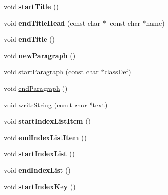 \begin{DoxyCompactItemize}
\mbox{\label{class_r_t_f_generator_af0954cd0854f60839004dda1b134f7e3}} 
void {\bfseries start\+Title} ()
\item 
\mbox{\label{class_r_t_f_generator_a881f413de3acd54c6bd5977c4add08d4}} 
void {\bfseries end\+Title\+Head} (const char $\ast$, const char $\ast$name)
\item 
\mbox{\label{class_r_t_f_generator_a9cc9028ce4b47900b45798c2d2006eca}} 
void {\bfseries end\+Title} ()
\item 
\mbox{\label{class_r_t_f_generator_a19bbf6e08804ee457c7aa9e07b833ba0}} 
void {\bfseries new\+Paragraph} ()
\item 
void \mbox{\hyperlink{class_r_t_f_generator_a98ea7dff7770c95c08f7f82dc872881b}{start\+Paragraph}} (const char $\ast$class\+Def)
\item 
void \mbox{\hyperlink{class_r_t_f_generator_aefcb5d16655eae184dcacecfd27c0068}{end\+Paragraph}} ()
\item 
void \mbox{\hyperlink{class_r_t_f_generator_ace3fd5e7a703cbae0272372d7e55083b}{write\+String}} (const char $\ast$text)
\item 
\mbox{\label{class_r_t_f_generator_a5effd10391cb320e9876ab54fab79cfa}} 
void {\bfseries start\+Index\+List\+Item} ()
\item 
\mbox{\label{class_r_t_f_generator_a87ab7629737717515752d5a71b068f96}} 
void {\bfseries end\+Index\+List\+Item} ()
\item 
\mbox{\label{class_r_t_f_generator_afe73f8487ef0728a9f1f3814ce38d813}} 
void {\bfseries start\+Index\+List} ()
\item 
\mbox{\label{class_r_t_f_generator_a44a83f3406938de95a8d4fbdce61f619}} 
void {\bfseries end\+Index\+List} ()
\item 
\mbox{\label{class_r_t_f_generator_a5cd7e617c40987804564ebf0cdab7efa}} 
void {\bfseries start\+Index\+Key} ()
\item 
\mbox{\label{class_r_t_f_generator_ac4ecc7a87cc163316582f02afa7e1cfd}} 

\end{DoxyCompactItemize}
